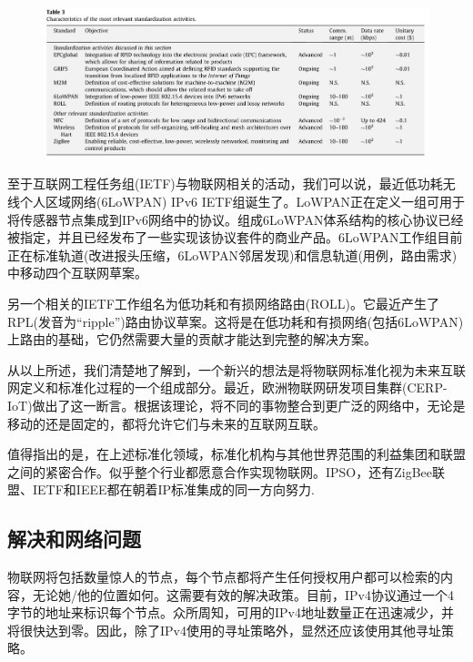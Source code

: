 \documentclass[12pt,a4paper]{article}%
\begin{document}
\begin{figure}[H]%
	\centering
	\begin{minipage}{1\textwidth}%
		\centering
		\includegraphics[width=1.0%
		\textwidth]{fig6.jpg}%
	\end{minipage}
\end{figure}

至于互联网工程任务组(IETF)与物联网相关的活动，我们可以说，最近低功耗无线个人区域网络(6LoWPAN) IPv6 IETF组诞生了。LoWPAN正在定义一组可用于将传感器节点集成到IPv6网络中的协议。组成6LoWPAN体系结构的核心协议已经被指定，并且已经发布了一些实现该协议套件的商业产品。6LoWPAN工作组目前正在标准轨道(改进报头压缩，6LoWPAN邻居发现)和信息轨道(用例，路由需求)中移动四个互联网草案。

另一个相关的IETF工作组名为低功耗和有损网络路由(ROLL)。它最近产生了RPL(发音为“ripple”)路由协议草案。这将是在低功耗和有损网络(包括6LoWPAN)上路由的基础，它仍然需要大量的贡献才能达到完整的解决方案。

从以上所述，我们清楚地了解到，一个新兴的想法是将物联网标准化视为未来互联网定义和标准化过程的一个组成部分。最近，欧洲物联网研发项目集群(CERP-IoT)做出了这一断言。根据该理论，将不同的事物整合到更广泛的网络中，无论是移动的还是固定的，都将允许它们与未来的互联网互联。

值得指出的是，在上述标准化领域，标准化机构与其他世界范围的利益集团和联盟之间的紧密合作。似乎整个行业都愿意合作实现物联网。IPSO，还有ZigBee联盟、IETF和IEEE都在朝着IP标准集成的同一方向努力.
\subsection{解决和网络问题}
物联网将包括数量惊人的节点，每个节点都将产生任何授权用户都可以检索的内容，无论她/他的位置如何。这需要有效的解决政策。目前，IPv4协议通过一个4字节的地址来标识每个节点。众所周知，可用的IPv4地址数量正在迅速减少，并将很快达到零。因此，除了IPv4使用的寻址策略外，显然还应该使用其他寻址策略。
\end{document}
